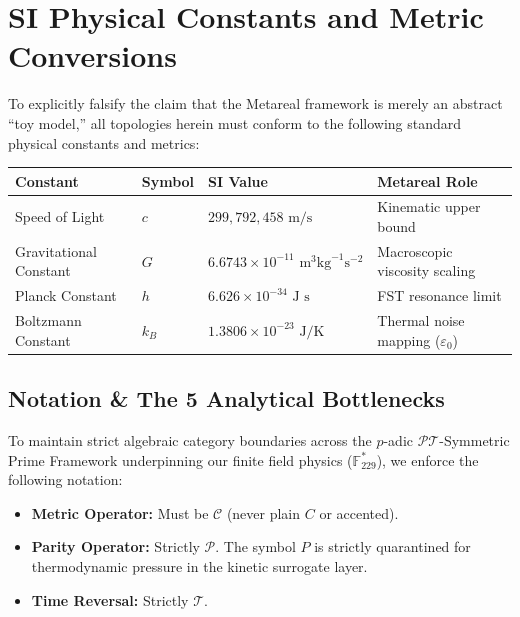 \section*{SI Physical Constants and Metric Conversions}
To explicitly falsify the claim that the Metareal framework is merely an abstract ``toy model,'' all topologies herein must conform to the following standard physical constants and metrics:
\begin{table}[ht]
\centering
\renewcommand{\arraystretch}{1.2}
\begin{tabular}{@{}llll@{}}
\toprule
\textbf{Constant} & \textbf{Symbol} & \textbf{SI Value} & \textbf{Metareal Role} \\
\midrule
Speed of Light & $c$ & $299,792,458 \text{ m/s}$ & Kinematic upper bound \\
Gravitational Constant & $G$ & $6.6743 \times 10^{-11} \text{ m}^3 \text{kg}^{-1} \text{s}^{-2}$ & Macroscopic viscosity scaling \\
Planck Constant & $h$ & $6.626 \times 10^{-34} \text{ J s}$ & FST resonance limit \\
Boltzmann Constant & $k_B$ & $1.3806 \times 10^{-23} \text{ J/K}$ & Thermal noise mapping ($\varepsilon_0$) \\
\bottomrule
\end{tabular}
\end{table}

\subsection*{Notation \& The 5 Analytical Bottlenecks}
To maintain strict algebraic category boundaries across the $p$-adic $\mathcal{PT}$-Symmetric Prime Framework underpinning our finite field physics ($\mathbb{F}_{229}^*$), we enforce the following notation: 
\begin{itemize}
    \item \textbf{Metric Operator:} Must be $\mathcal{C}$ (never plain $C$ or accented).
    \item \textbf{Parity Operator:} Strictly $\mathcal{P}$. The symbol $P$ is strictly quarantined for thermodynamic pressure in the kinetic surrogate layer. 
    \item \textbf{Time Reversal:} Strictly $\mathcal{T}$.
\end{itemize}

